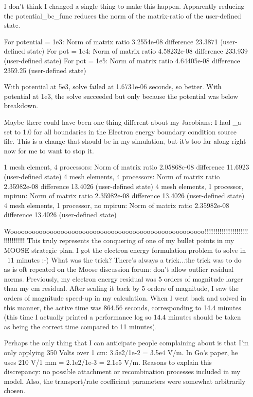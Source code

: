 I don't think I changed a single thing to make this happen. Apparently reducing the potential_bc_func reduces the norm of the matrix-ratio of the user-defined state.

For potential = 1e3: Norm of matrix ratio 3.2554e-08 difference 23.3871 (user-defined state)
For pot = 1e4: Norm of matrix ratio 4.58232e-08 difference 233.939 (user-defined state)
For pot = 1e5: Norm of matrix ratio 4.64405e-08 difference 2359.25 (user-defined state)

With potential at 5e3, solve failed at 1.6731e-06 seconds, so better.
With potential at 1e3, the solve succeeded but only because the potential was below breakdown.

Maybe there could have been one thing different about my Jacobians: I had _a set to 1.0 for all boundaries in the Electron energy boundary condition source file. This is a change that should be in my simulation, but it's too far along right now for me to want to stop it.

1 mesh element, 4 processors: Norm of matrix ratio 2.05868e-08 difference 11.6923 (user-defined state)
4 mesh elements, 4 processors: Norm of matrix ratio 2.35982e-08 difference 13.4026 (user-defined state)
4 mesh elements, 1 processor, mpirun: Norm of matrix ratio 2.35982e-08 difference 13.4026 (user-defined state)
4 mesh elements, 1 processor, no mpirun: Norm of matrix ratio 2.35982e-08 difference 13.4026 (user-defined state)

Woooooooooooooooooooooooooooooooooooooooooooooooooooooo!!!!!!!!!!!!!!!!!!!!!!!!!!!!!!!!!! This truly represents the conquering of one of my bullet points in my MOOSE strategic plan. I got the electron energy formulation problem to solve in ~11 minutes :-) What was the trick? There's always a trick...the trick was to do as is oft repeated on the Moose discussion forum: don't allow outlier residual norms. Previously, my electron energy residual was 5 orders of magnitude larger than my em residual. After scaling it back by 5 orders of magnitude, I saw the orders of magnitude speed-up in my calculation. When I went back and solved in this manner, the active time was 864.56 seconds, corresponding to 14.4 minutes (this time I actually printed a performance log so 14.4 minutes should be taken as being the correct time compared to 11 minutes).

Perhaps the only thing that I can anticipate people complaining about is that I'm only applying 350 Volts over 1 cm: 3.5e2/1e-2 = 3.5e4 V/m. In Go's paper, he uses 210 V/1 mm = 2.1e2/1e-3 = 2.1e5 V/m. Reasons to explain this discrepancy: no possible attachment or recombination processes included in my model. Also, the transport/rate coefficient parameters were somewhat arbitrarily chosen.

